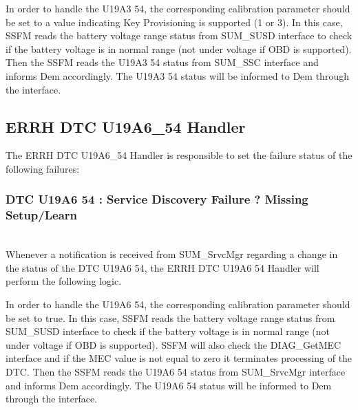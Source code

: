 In order to handle the U19A3 54, the corresponding calibration parameter  should be set to a value indicating Key Provisioning is supported (1 or 3).
In this case, SSFM reads the battery voltage range status from SUM_SUSD  interface to check if the battery voltage is in normal range (not under voltage if OBD is supported).
Then the SSFM reads the U19A3 54 status from SUM_SSC  interface and informs Dem accordingly.
The U19A3 54 status will be informed to Dem through the  interface.

{      }


\subsection{ERRH DTC U19A6_54 Handler}
The ERRH DTC U19A6_54 Handler is responsible to set the failure status of the following failures:

\subsubsection{DTC U19A6 54 : Service Discovery Failure ? Missing Setup/Learn}
\\
Whenever a notification is received from SUM_SrvcMgr regarding a change in the status of the DTC U19A6 54, the ERRH DTC U19A6 54 Handler will perform the following logic.

In order to handle the U19A6 54, the corresponding calibration parameter  should be set to true.
In this case, SSFM reads the battery voltage range status from SUM_SUSD  interface to check if the battery voltage is in normal range (not under voltage if OBD is supported).
SSFM will also check the DIAG_GetMEC interface and if the MEC value is not equal to zero it terminates processing of the DTC.
Then the SSFM reads the U19A6 54 status from SUM_SrvcMgr  interface and informs Dem accordingly.
The U19A6 54 status will be informed to Dem through the  interface.

{      }

